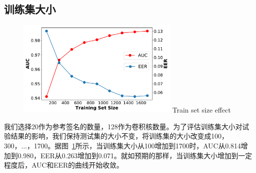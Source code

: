 \subsection{训练集大小}
\begin{figure}
  \centering
  \includegraphics[width=0.7\textwidth]{figure/train_size_auc_eer.pdf}
      {Train set size effect }
  \label{fig:train-size-effect}
\end{figure}
我们选择20作为参考签名的数量，128作为卷积核数量。为了评估训练集大小对试验结果的影响，我们保持测试集的大小不变，将训练集的大小改变成100，300，...，1700。据图~\ref{fig:train-size-effect}所示，当训练集大小从100增加到1700时，AUC从0.814增加到0.980，EER从0.263增加到0.071。就如预期的那样，当训练集大小增加到一定程度后，AUC和EER的曲线开始收敛。

